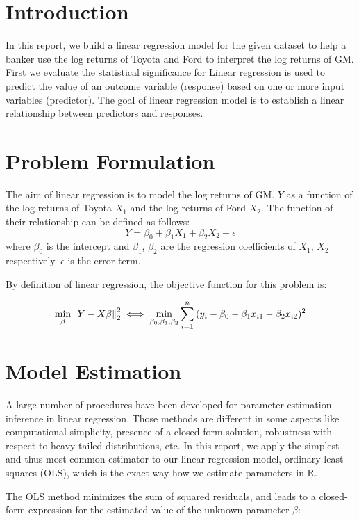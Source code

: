 \section{Introduction}

In this report, we build a linear regression model for the given dataset to help a banker use the log returns of Toyota and Ford to interpret the log returns of GM. First we evaluate the statistical significance for 
Linear regression is used to predict the value of an outcome variable (response) based on one or more input variables (predictor). The goal of linear regression model is to establish a linear relationship between predictors and responses. 

\section{Problem Formulation}

The aim of linear regression is to model the log returns of GM. $Y$ as a function of the log returns of Toyota $X_1$ and the log returns of Ford $X_2$. The function of their relationship can be defined as follows:
$$Y = \beta_0 + \beta_1 X_1 + \beta_2 X_2 + \epsilon$$
where $\beta_0$ is the intercept and $\beta_1$, $\beta_2$ are the regression coefficients of $X_1$, $X_2$ respectively. $\epsilon$ is the error term.

By definition of linear regression, the objective function for this problem is:

$$\min_{\beta} \left\lVert Y - X \beta \right\rVert^2_2 \iff \min_{\beta_0, \beta_1, \beta_2} \sum_{i=1}^{n} {(y_i - \beta_0 - \beta_1 x_{i1} - \beta_2 x_{i2})^2}$$


\section{Model Estimation}

A large number of procedures have been developed for parameter estimation inference in linear regression. Those methods are different in some aspects like computational simplicity, presence of a closed-form solution, robustness with respect to heavy-tailed distributions, etc. In this report, we apply the simplest and thus most common estimator to our linear regression model, ordinary least squares (OLS), which is the exact way how we estimate parameters in R. 

The OLS method minimizes the sum of squared residuals, and leads to a closed-form expression for the estimated value of the unknown parameter $\beta$:

